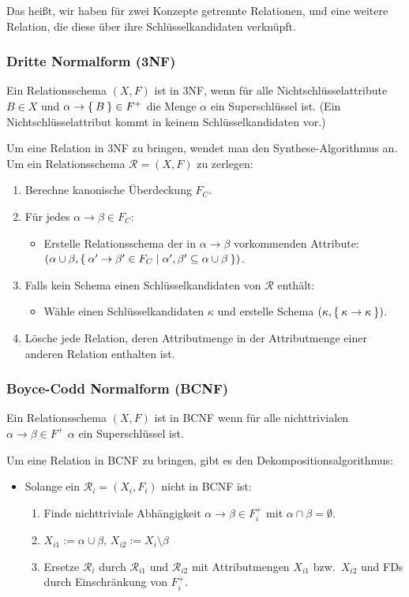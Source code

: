 \documentclass[a4paper,parskip=half*,DIV=15,fontsize=11pt]{scrartcl}
\begin{document}
Das heißt, wir haben für zwei Konzepte getrennte Relationen, und eine weitere Relation, die diese über ihre Schlüsselkandidaten verknüpft.

\subsubsection{Dritte Normalform (3NF)}
Ein Relationsschema $(X, F)$ ist in 3NF, wenn für alle Nichtschlüsselattribute $B \in X$ und $\alpha \to \Set{B} \in F^+$ die Menge $\alpha$ ein Superschlüssel ist. (Ein Nichtschlüsselattribut kommt in keinem Schlüsselkandidaten vor.)

Um eine Relation in 3NF zu bringen, wendet man den Synthese-Algorithmus an. Um ein Relationsschema $\mathcal{R} = (X,F)$ zu zerlegen:
\begin{enumerate}
\item Berechne kanonische Überdeckung $F_C$.
\item Für jedes $\alpha \to \beta \in F_C$:
\begin{itemize}
\item[] Erstelle Relationsschema der in $\alpha \to \beta$ vorkommenden Attribute:\\ $(\alpha \cup \beta, \Set{\alpha' \to \beta' \in F_C | \alpha', \beta' \subseteq \alpha \cup \beta})$.
\end{itemize}
\item Falls kein Schema einen Schlüsselkandidaten von $\mathcal{R}$ enthält:
\begin{itemize}
\item[] Wähle einen Schlüsselkandidaten $\kappa$ und erstelle Schema $(\kappa, \Set{\kappa \to \kappa})$.
\end{itemize}
\item Lösche jede Relation, deren Attributmenge in der Attributmenge einer anderen Relation enthalten ist.
\end{enumerate}

\subsubsection{Boyce-Codd Normalform (BCNF)}
Ein Relationsschema $(X, F)$ ist in BCNF wenn für alle nichttrivialen $\alpha \to \beta \in F^+$ $\alpha$ ein Superschlüssel ist.

Um eine Relation in BCNF zu bringen, gibt es den Dekompositionsalgorithmus:
\begin{itemize}
\item[] Solange ein $\mathcal{R}_i = (X_i, F_i)$ nicht in BCNF ist:
\begin{enumerate}
\item Finde nichttriviale Abhängigkeit $\alpha \to \beta \in F_i^+$ mit $\alpha \cap \beta = \emptyset$.
\item $X_{i1} := \alpha \cup \beta$, $X_{i2} := X_i \setminus \beta$
\item Ersetze $\mathcal{R}_i$ durch $\mathcal{R}_{i1}$ und $\mathcal{R}_{i2}$ mit Attributmengen $X_{i1}$ bzw.\ $X_{i2}$ und FDs durch Einschränkung von $F_i^+$.
\end{enumerate}
\end{itemize}
\end{document}

